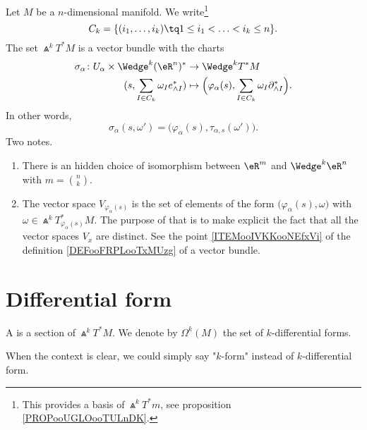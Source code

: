 \begin{propositionDef}		\label{DEFooZELVooFfosEn}
	Let \( M\) be a \( n\)-dimensional manifold. We write\footnote{This provides a basis of \( \Wedge^kT^*m\), see proposition \ref{PROPooUGLOooTULnDK}.}
	\begin{equation}
		C_k=\{ (i_1,\ldots,i_k)\tq 1\leq i_1<\ldots <i_k\leq n \}.
	\end{equation}
	The set \( \Wedge^kT^*M\) is a vector bundle with the charts
	\begin{equation}		\label{EQooOMWMooKKWhqf}
		\begin{aligned}
			\sigma_{\alpha}\colon U_{\alpha}\times \Wedge^k(\eR^n)^* & \to \Wedge^kT^*M                                                                       \\
			(s,\sum_{I\in C_k}\omega_Ie^*_{\wedge I})                & \mapsto \Big( \varphi_{\alpha}(s),  \sum_{I\in C_k}\omega_I\partial^*_{\wedge I}\Big).
		\end{aligned}
	\end{equation}
	In other words,
	\begin{equation}
		\sigma_{\alpha}(s,\omega')=\big( \varphi_{\alpha}(s),\tau_{\alpha,s}(\omega') \big).
	\end{equation}
	Two notes.
	\begin{enumerate}
		\item
		      There is an hidden choice of isomorphism between \( \eR^m\) and \( \Wedge^k\eR^n\) with \( m=\binom{ n }{ k }\).
		\item
		      The vector space \( V_{\varphi_{\alpha}(s)}\) is the set of elements of the form \( \big( \varphi_{\alpha}(s),\omega \big)\) with \( \omega\in \Wedge^kT^*_{\varphi_{\alpha}(s)}M\). The purpose of that is to make explicit the fact that all the vector spaces \( V_x\) are distinct. See the point \ref{ITEMooIVKKooNEfxVi} of the definition \ref{DEFooFRPLooTxMUzg} of a vector bundle.
	\end{enumerate}
\end{propositionDef}

\noproof


\section{Differential form}

\begin{definition}		\label{DEFooBRSSooWOgoov}
	A  is a section of \( \Wedge^kT^*M\). We denote by \( \Omega^k(M)\) the set of \( k\)-differential forms.

	When the context is clear, we could simply say "\( k\)-form" instead of \( k\)-differential form.
\end{definition}

